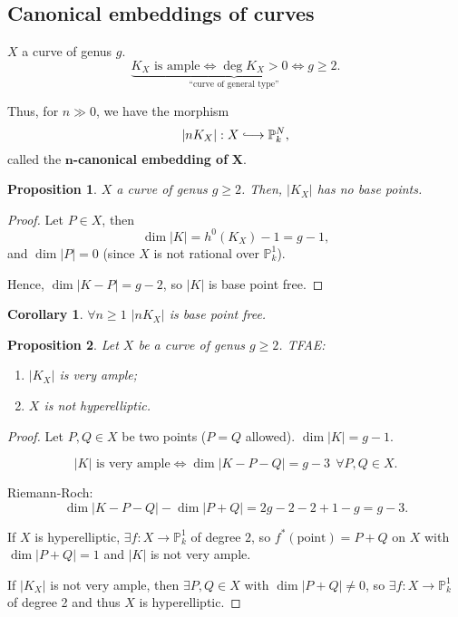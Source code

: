 \documentclass[12pt]{article}
\newtheorem*{proposition}{Proposition}
\newtheorem*{corollary}{Corollary}
\theoremstyle{definition}
\begin{document}
\subsection*{Canonical embeddings of curves}
$X$ a curve of genus $g$.
\[\underbrace{K_X\text{ is ample}\Longleftrightarrow\deg K_X>0\Longleftrightarrow g\geq2}_{\text{``curve of general type''}}.\]

Thus, for $n\gg0$, we have the morphism
\[|nK_X|:X\lhook\joinrel\longrightarrow\mathbb P_k^N,\]
called the $\boldsymbol n$\textbf{-canonical embedding of }$\boldsymbol X$.

\begin{proposition}
$X$ a curve of genus $g\geq2$. Then, $|K_X|$ has no base points.
\end{proposition}

\begin{proof}
Let $P\in X$, then
\[\dim|K|=h^0(K_X)-1=g-1,\]
and $\dim|P|=0$ (since $X$ is not rational over $\mathbb P_k^1$).

Hence, $\dim|K-P|=g-2$, so $|K|$ is base point free.
\end{proof}

\begin{corollary}
$\forall n\geq1$ $|nK_X|$ is base point free.
\end{corollary}

\begin{proposition}
Let $X$ be a curve of genus $g\geq2$. TFAE:
\begin{enumerate}[label=\arabic*)]
\item $|K_X|$ is very ample;
\item $X$ is not hyperelliptic.
\end{enumerate}
\end{proposition}

\begin{proof}
Let $P,Q\in X$ be two points ($P=Q$ allowed). $\dim|K|=g-1$.

\[|K|\text{ is very ample}\Longleftrightarrow\dim|K-P-Q|=g-3\ \ \forall P,Q\in X.\]

Riemann-Roch:
\[\dim|K-P-Q|-\dim|P+Q|=2g-2-2+1-g=g-3.\]

If $X$ is hyperelliptic, $\exists f:X\rightarrow\mathbb P_k^1$ of degree $2$, so $f^*(\text{point})=P+Q$ on $X$ with $\dim|P+Q|=1$ and $|K|$ is not very ample.

If $|K_X|$ is not very ample, then $\exists P,Q\in X$ with $\dim|P+Q|\neq0$, so $\exists f:X\rightarrow\mathbb P_k^1$ of degree 2 and thus $X$ is hyperelliptic.
\end{proof}
\end{document}
